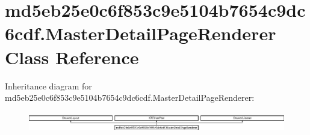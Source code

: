 \hypertarget{classmd5eb25e0c6f853c9e5104b7654c9dc6cdf_1_1MasterDetailPageRenderer}{}\section{md5eb25e0c6f853c9e5104b7654c9dc6cdf.\+Master\+Detail\+Page\+Renderer Class Reference}
\label{classmd5eb25e0c6f853c9e5104b7654c9dc6cdf_1_1MasterDetailPageRenderer}
Inheritance diagram for md5eb25e0c6f853c9e5104b7654c9dc6cdf.\+Master\+Detail\+Page\+Renderer\+:\begin{figure}[H]
\begin{center}
\leavevmode
\includegraphics[height=0.893142cm]{classmd5eb25e0c6f853c9e5104b7654c9dc6cdf_1_1MasterDetailPageRenderer}
\end{center}
\end{figure}
